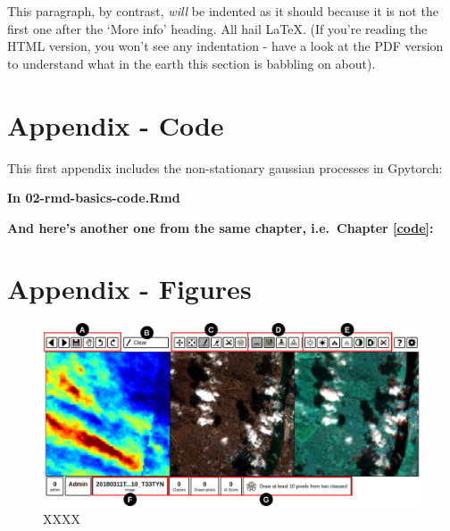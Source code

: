 \documentclass[a4paper, nobind]{templates/cdethesis}
\begin{document}
This paragraph, by contrast, \emph{will} be indented as it should because it is not the first one after the `More info' heading.
All hail LaTeX. (If you're reading the HTML version, you won't see any indentation - have a look at the PDF version to understand what in the earth this section is babbling on about).

\startappendices

\hypertarget{appendix---code}{%
\chapter{Appendix - Code}\label{appendix---code}}

This first appendix includes the non-stationary gaussian processes in Gpytorch:

\textbf{In 02-rmd-basics-code.Rmd}

\textbf{And here's another one from the same chapter, i.e.~Chapter \ref{code}:}

\hypertarget{appendix---figures}{%
\chapter{Appendix - Figures}\label{appendix---figures}}

\setcounter{figure}{0}
\makeatletter 
\renewcommand{\thefigure}{S\@arabic\c@figure}
\makeatother

\begin{figure}[!h]
    \centering
    \includegraphics[width=1\linewidth]{figures/extra/figureS2.png}
    \caption{XXXX}
    \label{fig:figureS02}
\end{figure}
\end{document}
